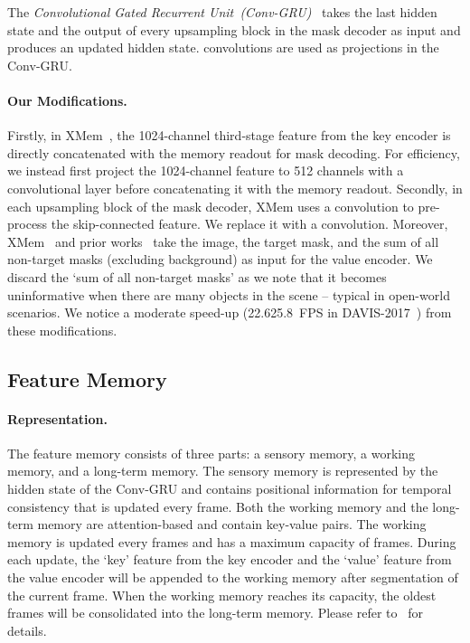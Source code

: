 The \textit{Convolutional Gated Recurrent Unit~(Conv-GRU)}~\cite{chung2014empirical} takes the last hidden state and the output of every upsampling block in the mask decoder as input and produces an updated hidden state.
 convolutions are used as projections in the Conv-GRU.

\paragraph{Our Modifications.}
Firstly, in XMem~\cite{cheng2022xmem}, the 1024\nobreakdash-channel third-stage feature from the key encoder is directly concatenated with the memory readout for mask decoding. For efficiency, we instead first project the 1024\nobreakdash-channel feature to 512 channels with a  convolutional layer before concatenating it with the memory readout. 
Secondly, in each upsampling block of the mask decoder, XMem uses a  convolution to pre-process the skip-connected feature. We replace it with a  convolution.
Moreover, XMem~\cite{cheng2022xmem} and prior works~\cite{oh2019videoSTM,cheng2021stcn} take the image, the target mask, and the sum of all non-target masks (excluding background) as input for the value encoder. We discard the `sum of all non-target masks' as we note that it becomes uninformative when there are many objects in the scene -- typical in open-world scenarios.
We notice a moderate speed-up (22.625.8~FPS in DAVIS-2017~\cite{caelles2019}) from these modifications.

\subsection{Feature Memory}
\paragraph{Representation.}
The feature memory consists of three parts: a sensory memory, a working memory, and a long-term memory. 
The sensory memory is represented by the hidden state of the Conv\nobreakdash-GRU and contains positional information for temporal consistency that is updated every frame.
Both the working memory and the long-term memory are attention-based and contain key-value pairs. The working memory is updated every  frames and has a maximum capacity of  frames. During each update, the `key' feature from the key encoder and the `value' feature from the value encoder will be appended to the working memory after segmentation of the current frame.
When the working memory reaches its capacity, the oldest   frames will be consolidated into the long-term memory. Please refer to~\cite{cheng2022xmem} for details.

